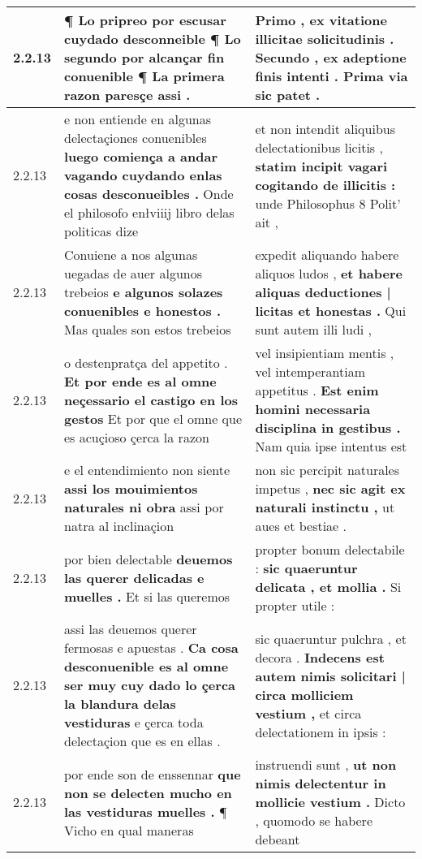 \begin{tabular}{|p{1cm}|p{6.5cm}|p{6.5cm}|}
2.2.13 & ¶ Lo pripreo por escusar cuydado desconneible ¶ \textbf{ Lo segundo por alcançar fin conuenible ¶ } La primera razon paresçe assi . & Primo , ex vitatione illicitae solicitudinis . \textbf{ Secundo , ex adeptione finis intenti . } Prima via sic patet . \\\hline
2.2.13 & e non entiende en algunas delectaçiones conuenibles \textbf{ luego comiença a andar vagando cuydando enlas cosas desconueibles . } Onde el philosofo enłviiij libro delas politicas dize & et non intendit aliquibus delectationibus licitis , \textbf{ statim incipit vagari cogitando de illicitis : } unde Philosophus 8 Polit’ ait , \\\hline
2.2.13 & Conuiene a nos algunas uegadas de auer algunos trebeios \textbf{ e algunos solazes conuenibles e honestos . } Mas quales son estos trebeios & expedit aliquando habere aliquos ludos , \textbf{ et habere aliquas deductiones | licitas et honestas . } Qui sunt autem illi ludi , \\\hline
2.2.13 & o destenpratça del appetito . \textbf{ Et por ende es al omne neçessario el castigo en los gestos } Et por que el omne que es acuçioso çerca la razon & vel insipientiam mentis , vel intemperantiam appetitus . \textbf{ Est enim homini necessaria disciplina in gestibus . } Nam quia ipse intentus est \\\hline
2.2.13 & e el entendimiento non siente \textbf{ assi los mouimientos naturales ni obra } assi por natra al inclinaçion & non sic percipit naturales impetus , \textbf{ nec sic agit ex naturali instinctu , } ut aues et bestiae . \\\hline
2.2.13 & por bien delectable \textbf{ deuemos las querer delicadas e muelles . } Et si las queremos & propter bonum delectabile : \textbf{ sic quaeruntur delicata , et mollia . } Si propter utile : \\\hline
2.2.13 & assi las deuemos querer fermosas e apuestas . \textbf{ Ca cosa desconuenible es al omne ser muy cuy dado lo çerca la blandura delas vestiduras } e çerca toda delectaçion que es en ellas . & sic quaeruntur pulchra , et decora . \textbf{ Indecens est autem nimis solicitari | circa molliciem vestium , } et circa delectationem in ipsis : \\\hline
2.2.13 & por ende son de enssennar \textbf{ que non se delecten mucho en las vestiduras muelles . } ¶ Vicho en qual maneras & instruendi sunt , \textbf{ ut non nimis delectentur in mollicie vestium . } Dicto , quomodo se habere debeant \\\hline

\end{tabular}
